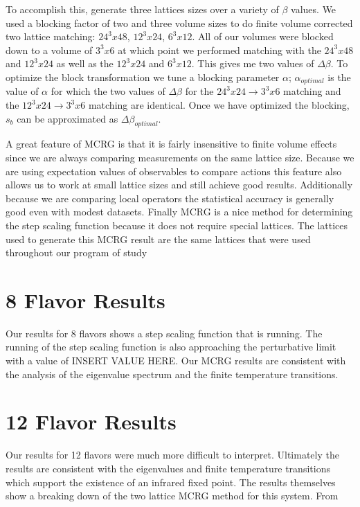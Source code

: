 \documentclass{PoS}
\begin{document}
To accomplish this, generate three lattices sizes over a variety of $\beta$ values.
We used a blocking factor of two and three volume sizes to do finite volume corrected two lattice matching: $24^3x48$, $12^3x24$, $6^3x12$.
All of our volumes were blocked down to a volume of $3^3x6$ at which point we performed matching with the $24^3x48$ and $12^3x24$ as well as the $12^3x24$ and $6^3x12$.
This gives me two values of $\Delta\beta$.
To optimize the block transformation we tune a blocking parameter $\alpha$; $\alpha_{optimal}$ is the value of $\alpha$ for which the two values of $\Delta\beta$ for the $24^3x24\to3^3x6$ matching and the $12^3x24\to3^3x6$ matching are identical.
Once we have optimized the blocking, $s_b$ can be approximated as $\Delta\beta_{optimal}$.

A great feature of MCRG is that it is fairly insensitive to finite volume effects since we are always comparing measurements on the same lattice size.
Because we are using expectation values of observables to compare actions this feature also allows us to work at small lattice sizes and still achieve good results.
Additionally because we are comparing local operators the statistical accuracy is generally good even with modest datasets.
Finally MCRG is a nice method for determining the step scaling function because it does not require special lattices.
The lattices used to generate this MCRG result are the same lattices that were used throughout our program of study

\section{8 Flavor Results}
Our results for 8 flavors shows a step scaling function that is running.
The running of the step scaling function is also approaching the perturbative limit with a value of INSERT VALUE HERE.
Our MCRG results are consistent with the analysis of the eigenvalue spectrum and the finite temperature transitions.


\section{12 Flavor Results}
Our results for 12 flavors were much more difficult to interpret.  
Ultimately the results are consistent with the eigenvalues and finite temperature transitions which support the existence of an infrared fixed point.
The results themselves show a breaking down of the two lattice MCRG method for this system.  From 
\end{document}
